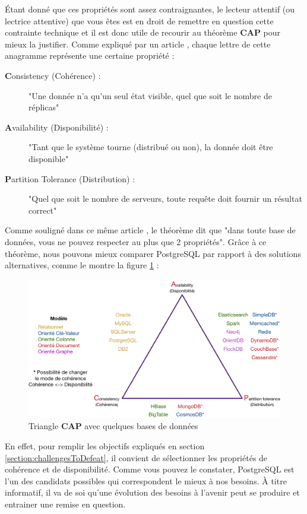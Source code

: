 \pagebreak

Étant donné que ces propriétés sont assez contraignantes, le lecteur attentif (ou lectrice attentive) que vous êtes est en droit de remettre en question cette contrainte technique et il est donc utile de recourir au théorème \textbf{CAP} pour mieux la justifier.
Comme expliqué par un article \cite{acid_cap}, chaque lettre de cette anagramme représente une certaine propriété :
\begin{description}
    \item[\textbf{C}onsistency (Cohérence) :] "Une donnée n'a qu'un seul état visible, quel que soit le nombre de réplicas"
    \item[\textbf{A}vailability (Disponibilité) :] "Tant que le système tourne (distribué ou non), la donnée doit être disponible"
    \item[\textbf{P}artition Tolerance (Distribution) :] "Quel que soit le nombre de serveurs, toute requête doit fournir un résultat correct" 
\end{description}

Comme souligné dans ce même article \cite{acid_cap}, le théorème dit que "dans toute base de données, vous ne pouvez respecter au plus que 2 propriétés".
Grâce à ce théorème, nous pouvons mieux comparer PostgreSQL par rapport à des solutions alternatives, comme le montre la figure \ref{pic:capTriangleWithSomeDatabases} :

\begin{figure}[H]
    \includegraphics[width=\textwidth,height=\textheight,keepaspectratio]{images/cahierDesCharges/triangleCAP_with_databases.png}
    \centering
    \caption[Triangle \textbf{CAP} avec quelques bases de données]{Triangle \textbf{CAP} avec quelques bases de données \cite{acid_cap}}
    \label{pic:capTriangleWithSomeDatabases}
\end{figure}

En effet, pour remplir les objectifs expliqués en section \ref{section:challengesToDefeat}, il convient de sélectionner les propriétés de cohérence et de disponibilité.
Comme vous pouvez le constater, PostgreSQL est l'un des candidats possibles qui correspondent le mieux à nos besoins.
À titre informatif, il va de soi qu'une évolution des besoins à l'avenir peut se produire et entrainer une remise en question.